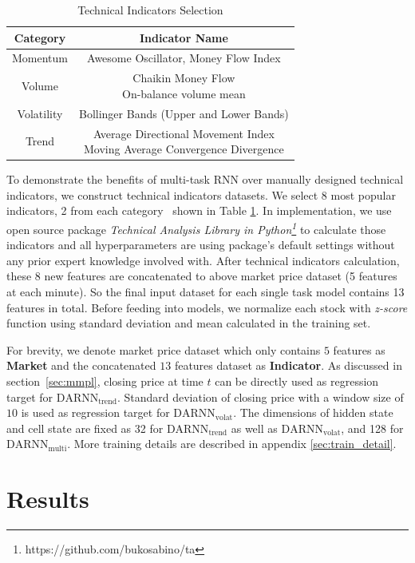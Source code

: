 \begin{table}[H]
\centering
\small
\caption{Technical Indicators Selection}
\begin{tabular}{|c|c|} \hline
  Category&Indicator Name\\ \hline
  Momentum& Awesome Oscillator, Money Flow Index\\ \hline
  Volume& \makecell{Chaikin Money Flow\\ On-balance volume mean}\\ \hline
  Volatility& Bollinger Bands (Upper and Lower Bands)\\ \hline
  Trend& \makecell{Average Directional Movement Index\\Moving Average Convergence Divergence}\\ \hline
\end{tabular}
  \label{tab:ta}
\end{table}
To demonstrate the benefits of multi-task RNN over manually designed
technical indicators, we construct technical
indicators datasets. We select 8 most popular indicators, 2 from each
category~\cite{kirkpatrick2010technical} shown in Table
\ref{tab:ta}. In implementation, we use open source package
\emph{Technical Analysis Library in
  Python\footnote{https://github.com/bukosabino/ta}} to calculate
those indicators and all hyperparameters are using package's
default settings without any prior expert knowledge involved
with. After technical indicators calculation, these 8 new
features are concatenated to above market price dataset (5
features at each minute). So the final input dataset for each
single task model contains 13 features in total. Before feeding
into models, we normalize each stock with \emph{z-score} function
using standard deviation and mean calculated in the training set.

For brevity, we denote market price dataset which only contains
$5$ features as \textbf{Market} and the concatenated $13$
features dataset as \textbf{Indicator}. As discussed in
section~\ref{sec:mmpl}, closing price at time $t$ can be directly
used as regression target for $\text{DARNN}_{\text{trend}}$.
Standard deviation of closing price with a window size of $10$ is
used as regression target for $\text{DARNN}_{\text{volat}}$. The
dimensions of hidden state and cell state are fixed as 32 for
$\text{DARNN}_{\text{trend}}$ as well as
$\text{DARNN}_{\text{volat}}$, and 128 for
$\text{DARNN}_{\text{multi}}$. More training details are
described in appendix \ref{sec:train_detail}.

\section{Results}
\label{sec:res}

